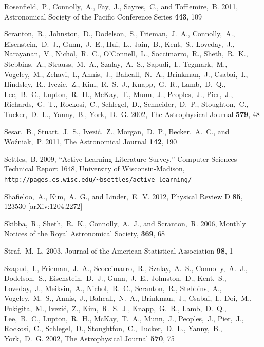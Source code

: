 \documentclass[useAMS,usenatbib,tightenlines,11pt,preprint]{aastex}
\begin{document}
\begin{thebibliography}{99}
Rosenfield,~P., Connolly,~A., Fay,~J., Sayres,~C., and Tofflemire,~B. 2011,
Astronomical Society of the Pacific Conference Series {\bf 443}, 109

Scranton,~R., Johnston,~D., Dodelson,~S., Frieman,~J.~A., Connolly,~A.,
Eisenstein,~D.~J., Gunn,~J.~E., Hui,~L., Jain,~B., Kent,~S., Loveday,~J.,
Narayanan,~V., Nichol,~R.~C., O'Connell,~L., Soccimarro,~R., Sheth,~R.~K.,
Stebbins,~A., Strauss,~M.~A., Szalay,~A.~S., Sapudi,~I., Tegmark,~M.,
Vogeley,~M., Zehavi,~I., Annis,~J., Bahcall,~N.~A., Brinkman,~J., Csabai,~I.,
Hindsley,~R., Ivezic,~Z., Kim,~R.~S.~J., Knapp,~G.~R., Lamb,~D.~Q., Lee,~B.~C.,
Lupton,~R.~H., McKay,~T., Munn,~J., Peoples,~J., Pier,~J., Richards,~G.~T.,
Rockosi,~C., Schlegel,~D., Schneider,~D.~P., Stoughton,~C., Tucker,~D.~L.,
Yanny,~B., York,~D.~G. 2002, The Astrophysical Journal {\bf 579}, 48

Sesar,~B., Stuart,~J.~S., Ivezi\'c,~\u Z., Morgan,~D.~P., Becker,~A.~C., and
Wo\'zniak,~P. 2011, The Astronomical Journal {\bf 142}, 190

Settles,~B. 2009, ``Active Learning Literature Survey,'' Computer Sciences Technical
Report 1648, University of Wisconsin-Madison,
\verb|http://pages.cs.wisc.edu/~bsettles/active-learning/|


Shafieloo,~A., Kim,~A.~G., and Linder,~E.~V. 2012,
Physical Review D {\bf 85}, 123530 [arXiv:1204.2272]


Skibba,~R., Sheth,~R.~K., Connolly,~A.~J., and Scranton,~R. 2006,
Monthly Notices of the Royal Astronomical Society, {\bf 369}, 68

Straf,~M.~L. 2003, Journal of the American Statistical Association {\bf 98}, 1

Szapud,~I., Frieman,~J.~A., Scoccimarro,~R., Szalay,~A.~S., Connolly,~A.~J.,
Dodelson,~S., Eisenstein,~D.~J., Gunn,~J.~E., Johnston,~D., Kent,~S.,
Loveday,~J., Meiksin,~A., Nichol,~R.~C., Scranton,~R., Stebbins,~A.,
Vogeley,~M.~S., Annis,~J., Bahcall,~N.~A., Brinkman,~J., Csabai,~I., Doi,~M.,
Fukigita,~M., Ivezi\'c,~\u Z., Kim,~R.~S.~J., Knapp,~G.~R., Lamb,~D.~Q.,
Lee,~B.~C., Lupton,~R.~H., McKay,~T.~A., Munn,~J., Peoples,~J., Pier,~J.,
Rockosi,~C., Schlegel,~D., Stoughtfon,~C., Tucker,~D.~L., Yanny,~B., York,~D.~G.
2002, The Astrophysical Journal {\bf 570}, 75


\end{thebibliography}
\end{document}
